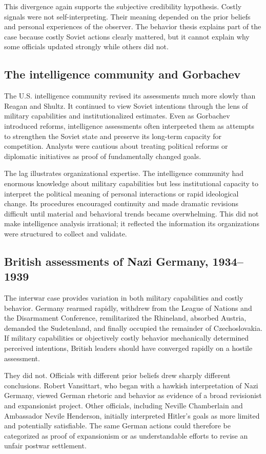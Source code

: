 This divergence again supports the subjective credibility hypothesis. Costly signals were not self-interpreting. Their meaning depended on the prior beliefs and personal experiences of the observer. The behavior thesis explains part of the case because costly Soviet actions clearly mattered, but it cannot explain why some officials updated strongly while others did not.

\subsection{The intelligence community and Gorbachev}

The U.S. intelligence community revised its assessments much more slowly than Reagan and Shultz. It continued to view Soviet intentions through the lens of military capabilities and institutionalized estimates. Even as Gorbachev introduced reforms, intelligence assessments often interpreted them as attempts to strengthen the Soviet state and preserve its long-term capacity for competition. Analysts were cautious about treating political reforms or diplomatic initiatives as proof of fundamentally changed goals.

The lag illustrates organizational expertise. The intelligence community had enormous knowledge about military capabilities but less institutional capacity to interpret the political meaning of personal interactions or rapid ideological change. Its procedures encouraged continuity and made dramatic revisions difficult until material and behavioral trends became overwhelming. This did not make intelligence analysis irrational; it reflected the information its organizations were structured to collect and validate.

\subsection{British assessments of Nazi Germany, 1934--1939}

The interwar case provides variation in both military capabilities and costly behavior. Germany rearmed rapidly, withdrew from the League of Nations and the Disarmament Conference, remilitarized the Rhineland, absorbed Austria, demanded the Sudetenland, and finally occupied the remainder of Czechoslovakia. If military capabilities or objectively costly behavior mechanically determined perceived intentions, British leaders should have converged rapidly on a hostile assessment.

They did not. Officials with different prior beliefs drew sharply different conclusions. Robert Vansittart, who began with a hawkish interpretation of Nazi Germany, viewed German rhetoric and behavior as evidence of a broad revisionist and expansionist project. Other officials, including Neville Chamberlain and Ambassador Nevile Henderson, initially interpreted Hitler's goals as more limited and potentially satisfiable. The same German actions could therefore be categorized as proof of expansionism or as understandable efforts to revise an unfair postwar settlement.


